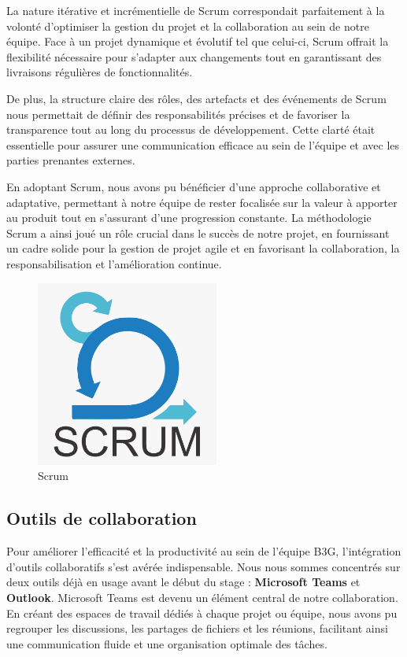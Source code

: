 La nature itérative et incrémentielle de Scrum correspondait parfaitement à la volonté d'optimiser la gestion du projet et la collaboration au sein de notre équipe. Face à un projet dynamique et évolutif tel que celui-ci, Scrum offrait la flexibilité nécessaire pour s'adapter aux changements tout en garantissant des livraisons régulières de fonctionnalités.

De plus, la structure claire des rôles, des artefacts et des événements de Scrum nous permettait de définir des responsabilités précises et de favoriser la transparence tout au long du processus de développement. Cette clarté était essentielle pour assurer une communication efficace au sein de l'équipe et avec les parties prenantes externes.

En adoptant Scrum, nous avons pu bénéficier d'une approche collaborative et adaptative, permettant à notre équipe de rester focalisée sur la valeur à apporter au produit tout en s'assurant d'une progression constante. La méthodologie Scrum a ainsi joué un rôle crucial dans le succès de notre projet, en fournissant un cadre solide pour la gestion de projet agile et en favorisant la collaboration, la responsabilisation et l'amélioration continue.


\begin{figure}[H] 
    \centering
    \includegraphics[width=6cm]{Figures/scrum.png}
    \caption{Scrum}
\end{figure}








\subsection{Outils de collaboration}

Pour améliorer l'efficacité et la productivité au sein de l'équipe B3G, l'intégration d'outils collaboratifs s'est avérée indispensable. Nous nous sommes concentrés sur deux outils déjà en usage avant le début du stage : \textbf{Microsoft Teams} et \textbf{Outlook}. Microsoft Teams est devenu un élément central de notre collaboration. En créant des espaces de travail dédiés à chaque projet ou équipe, nous avons pu regrouper les discussions, les partages de fichiers et les réunions, facilitant ainsi une communication fluide et une organisation optimale des tâches.

